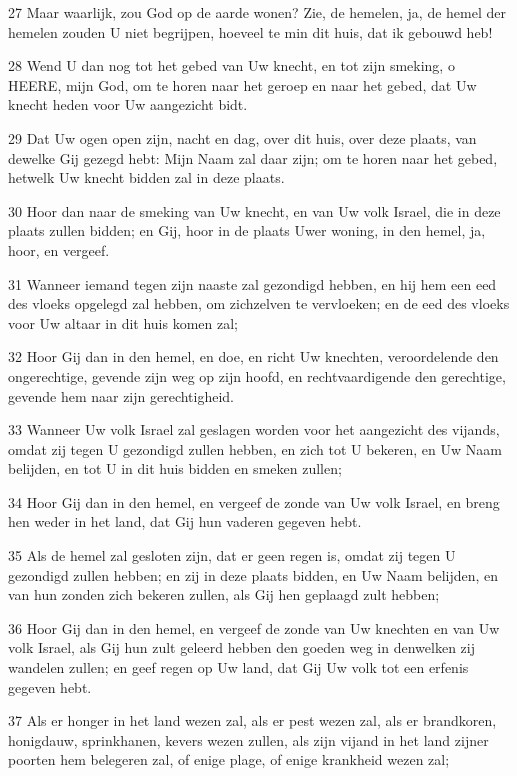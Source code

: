 \par 27 Maar waarlijk, zou God op de aarde wonen? Zie, de hemelen, ja, de hemel der hemelen zouden U niet begrijpen, hoeveel te min dit huis, dat ik gebouwd heb!
\par 28 Wend U dan nog tot het gebed van Uw knecht, en tot zijn smeking, o HEERE, mijn God, om te horen naar het geroep en naar het gebed, dat Uw knecht heden voor Uw aangezicht bidt.
\par 29 Dat Uw ogen open zijn, nacht en dag, over dit huis, over deze plaats, van dewelke Gij gezegd hebt: Mijn Naam zal daar zijn; om te horen naar het gebed, hetwelk Uw knecht bidden zal in deze plaats.
\par 30 Hoor dan naar de smeking van Uw knecht, en van Uw volk Israel, die in deze plaats zullen bidden; en Gij, hoor in de plaats Uwer woning, in den hemel, ja, hoor, en vergeef.
\par 31 Wanneer iemand tegen zijn naaste zal gezondigd hebben, en hij hem een eed des vloeks opgelegd zal hebben, om zichzelven te vervloeken; en de eed des vloeks voor Uw altaar in dit huis komen zal;
\par 32 Hoor Gij dan in den hemel, en doe, en richt Uw knechten, veroordelende den ongerechtige, gevende zijn weg op zijn hoofd, en rechtvaardigende den gerechtige, gevende hem naar zijn gerechtigheid.
\par 33 Wanneer Uw volk Israel zal geslagen worden voor het aangezicht des vijands, omdat zij tegen U gezondigd zullen hebben, en zich tot U bekeren, en Uw Naam belijden, en tot U in dit huis bidden en smeken zullen;
\par 34 Hoor Gij dan in den hemel, en vergeef de zonde van Uw volk Israel, en breng hen weder in het land, dat Gij hun vaderen gegeven hebt.
\par 35 Als de hemel zal gesloten zijn, dat er geen regen is, omdat zij tegen U gezondigd zullen hebben; en zij in deze plaats bidden, en Uw Naam belijden, en van hun zonden zich bekeren zullen, als Gij hen geplaagd zult hebben;
\par 36 Hoor Gij dan in den hemel, en vergeef de zonde van Uw knechten en van Uw volk Israel, als Gij hun zult geleerd hebben den goeden weg in denwelken zij wandelen zullen; en geef regen op Uw land, dat Gij Uw volk tot een erfenis gegeven hebt.
\par 37 Als er honger in het land wezen zal, als er pest wezen zal, als er brandkoren, honigdauw, sprinkhanen, kevers wezen zullen, als zijn vijand in het land zijner poorten hem belegeren zal, of enige plage, of enige krankheid wezen zal;
